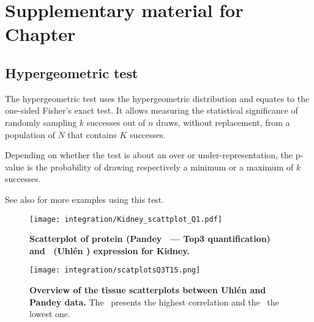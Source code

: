 \chapter{Suppl\texorpdfstring{ementary}{.} material for Chap\texorpdfstring{ter}{.}
}\label{ch:SupplIntegration}


\section{Hypergeometric test}\label{sec:hypergeometricTest}

The hypergeometric test uses the hypergeometric distribution
and equates to the one-sided Fisher's exact test.
It allows measuring the statistical significance of
randomly sampling $k$ successes out of $n$ draws, without replacement,
from a population of $N$ that contains $K$ successes.

Depending on whether the test is about an over or under-representation,
the p-value is the probability of drawing respectively
a minimum or a maximum of $k$ successes.

See also \citet{Johnson2005-mf} for more examples using this test.\mybr\

\begin{figure}[!htb]
    \texttt{[image: integration/Kidney\_scattplot\_Q1.pdf]}\centering
    \caption[Scatterplot of protein (Pandey \etal\ --- Top3 quantification)
    and \mRNA\ (Uhlén \etal) expression for Kidney]{\label{fig:ScatKidQ1}%
    \textbf{Scatterplot of protein (Pandey \etal\ --- Top3 quantification)
    and \mRNA\ (Uhlén \etal) expression for Kidney.}}
\end{figure}


\begin{figure}[htp]
    \texttt{[image: integration/scatplotsQ3T15.png]}\centering
    \caption[Overview of the tissue scatterplots between Uhlén and Pandey data]{%
    \label{fig:scatplotAll}\textbf{Overview of the tissue scatterplots
    between Uhlén and Pandey data.}
    The \liver\ presents the highest correlation and the \oesophagus\ the lowest one.}
\end{figure}

\pagestyle{plain}
\small

